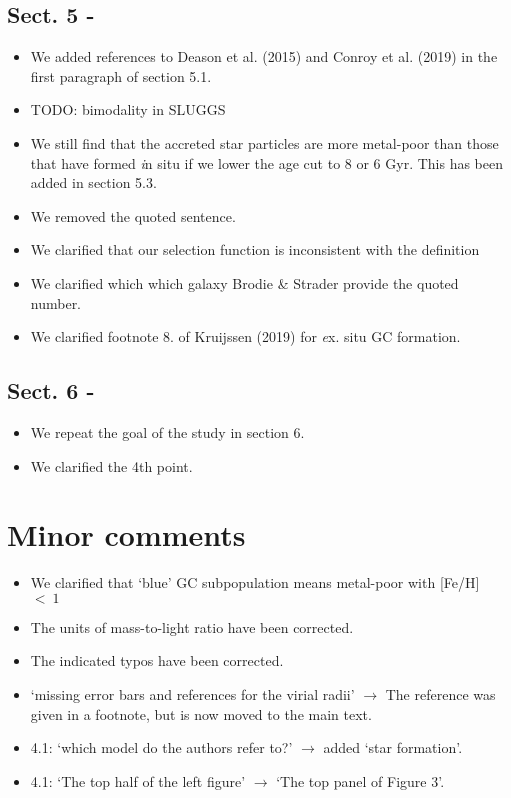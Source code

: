 \documentclass{article}
\begin{document}
\subsection*{Sect. 5 -}
\begin{itemize}
\item We added references to Deason et al. (2015) and Conroy et al. (2019) in
the first paragraph of section 5.1.
\item TODO: bimodality in SLUGGS
\item We still find that the accreted star particles are more metal-poor than 
those that have formed {\textit in situ} if we lower the age cut to 8 or 6 Gyr.
This has been added in section 5.3.
\item We removed the quoted sentence.
\item We clarified that our selection function is inconsistent with the definition
\item We clarified which which galaxy Brodie \& Strader provide the quoted number.
\item We clarified footnote 8.
of Kruijssen (2019) for {\textit ex. situ} GC formation.
\end{itemize}

\subsection*{Sect. 6 -}
\begin{itemize}
\item We repeat the goal of the study in section 6.
\item We clarified the 4th point.
\end{itemize}


\section*{Minor comments}
\begin{itemize}
\item We clarified that `blue' GC subpopulation means metal-poor with [Fe/H]~$<~1$
\item The units of mass-to-light ratio have been corrected.
\item The indicated typos have been corrected.
\item `missing error bars and references for the virial radii' $\rightarrow$
    The reference was given in a footnote, but is now moved to the main text.
\item 4.1: `which model do the authors refer to?' $\rightarrow$ 
    added `star formation'.
\item 4.1: `The top half of the left figure' $\rightarrow$ 
    `The top panel of Figure 3'.
\end{itemize}
\end{document}
